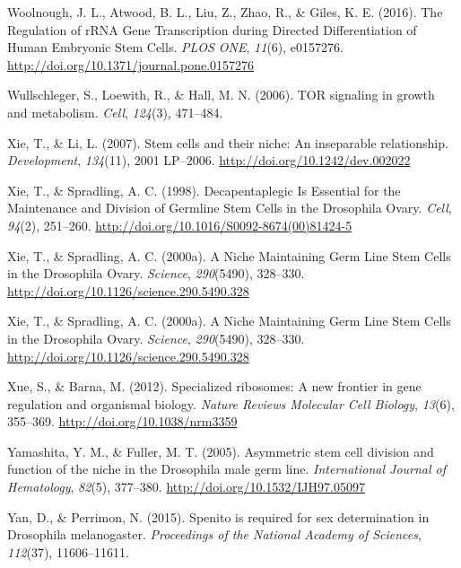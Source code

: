 \documentclass[12pt,twoside]{reedthesis}
\newlength{\cslhangindent}
\newenvironment{cslreferences}%
  {\setlength{\parindent}{0pt}%
  \everypar{\setlength{\hangindent}{\cslhangindent}}\ignorespaces}%
  {\par}
\begin{document}
\begin{cslreferences}
\leavevmode\hypertarget{ref-woolnoughRegulationRRNAGene2016}{}%
Woolnough, J. L., Atwood, B. L., Liu, Z., Zhao, R., \& Giles, K. E. (2016). The Regulation of rRNA Gene Transcription during Directed Differentiation of Human Embryonic Stem Cells. \emph{PLOS ONE}, \emph{11}(6), e0157276. \url{http://doi.org/10.1371/journal.pone.0157276}

\leavevmode\hypertarget{ref-Wullschleger2006b}{}%
Wullschleger, S., Loewith, R., \& Hall, M. N. (2006). TOR signaling in growth and metabolism. \emph{Cell}, \emph{124}(3), 471--484.

\leavevmode\hypertarget{ref-Xie2007a}{}%
Xie, T., \& Li, L. (2007). Stem cells and their niche: An inseparable relationship. \emph{Development}, \emph{134}(11), 2001 LP--2006. \url{http://doi.org/10.1242/dev.002022}

\leavevmode\hypertarget{ref-Xie1998d}{}%
Xie, T., \& Spradling, A. C. (1998). Decapentaplegic Is Essential for the Maintenance and Division of Germline Stem Cells in the Drosophila Ovary. \emph{Cell}, \emph{94}(2), 251--260. \url{http://doi.org/10.1016/S0092-8674(00)81424-5}

\leavevmode\hypertarget{ref-Xie2000b}{}%
Xie, T., \& Spradling, A. C. (2000a). A Niche Maintaining Germ Line Stem Cells in the Drosophila Ovary. \emph{Science}, \emph{290}(5490), 328--330. \url{http://doi.org/10.1126/science.290.5490.328}

\leavevmode\hypertarget{ref-Xie2000b}{}%
Xie, T., \& Spradling, A. C. (2000a). A Niche Maintaining Germ Line Stem Cells in the Drosophila Ovary. \emph{Science}, \emph{290}(5490), 328--330. \url{http://doi.org/10.1126/science.290.5490.328}

\leavevmode\hypertarget{ref-Xue2012}{}%
Xue, S., \& Barna, M. (2012). Specialized ribosomes: A new frontier in gene regulation and organismal biology. \emph{Nature Reviews Molecular Cell Biology}, \emph{13}(6), 355--369. \url{http://doi.org/10.1038/nrm3359}

\leavevmode\hypertarget{ref-Yamashita2005d}{}%
Yamashita, Y. M., \& Fuller, M. T. (2005). Asymmetric stem cell division and function of the niche in the Drosophila male germ line. \emph{International Journal of Hematology}, \emph{82}(5), 377--380. \url{http://doi.org/10.1532/IJH97.05097}

\leavevmode\hypertarget{ref-Yan2015}{}%
Yan, D., \& Perrimon, N. (2015). Spenito is required for sex determination in Drosophila melanogaster. \emph{Proceedings of the National Academy of Sciences}, \emph{112}(37), 11606--11611.


\end{cslreferences}
\end{document}
